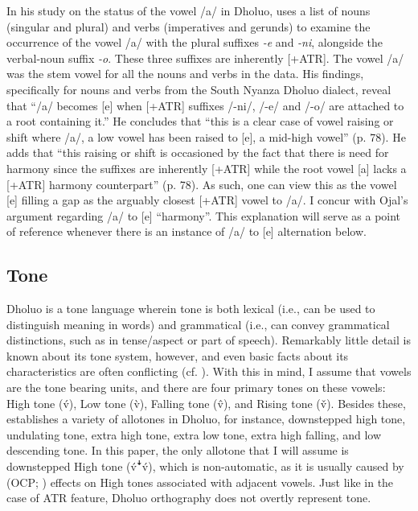 \documentclass[output=paper,colorlinks,citecolor=brown]{langscibook}
\begin{document}
In his study on the status of the vowel /a/ in Dholuo, \citet{Ojal2015} uses a list of nouns (singular and plural) and verbs (imperatives and gerunds) to examine the occurrence of the vowel /a/ with the plural suffixes \textit{-e} and \textit{-ni}, alongside the verbal-noun suffix \textit{-o}. These three suffixes are inherently [+ATR]. The vowel /a/ was the stem vowel for all the nouns and verbs in the data. His findings, specifically for nouns and verbs from the  South Nyanza Dholuo dialect, reveal that “/a/ becomes [e] when [+ATR] suffixes /-ni/, /-e/ and /-o/ are attached to a root containing it.” He concludes that “this is a clear case of vowel raising or shift where /a/, a low vowel has been raised to [e], a mid-high vowel” (p. 78). He adds that “this raising or shift is occasioned by the fact that there is need for harmony since the suffixes are inherently [+ATR] while the root vowel [a] lacks a [+ATR] harmony counterpart” (p. 78). As such, one can view this as the vowel [e] filling a gap as the arguably closest [+ATR] vowel to /a/. I concur with Ojal’s argument regarding /a/ to [e] ``harmony''. This explanation will serve as a point of reference whenever there is an instance of /a/ to [e] alternation below. 

\subsection{Tone}

Dholuo is a tone language wherein tone is both lexical (i.e., can be used to distinguish meaning in words) and grammatical (i.e., can convey grammatical distinctions, such as in tense/aspect or part of speech). Remarkably little detail is known about its tone system, however, and even basic facts about its characteristics are often conflicting (cf. \citealt{Gregersen1961, Okoth-Okombo1982, Okoth-Okombo1997, Ombijah2020, Tucker1994}). With this in mind, I assume that vowels are the tone bearing units, and there are four primary tones on these vowels: High tone (v́), Low tone (v̀), Falling tone (v̂), and Rising tone (v̌). Besides these, \citet{Tucker1994} establishes a variety of allotones in Dholuo, for instance, downstepped high tone, undulating tone, extra high tone, extra low tone, extra high falling, and low descending tone. In this paper, the only allotone that I will assume is downstepped High tone (v́ꜜv́), which is non-automatic, as it is usually caused by  (OCP; \citealt{Leben1973}) effects on High tones associated with adjacent vowels. Just like in the case of ATR feature, Dholuo orthography does not overtly represent tone.
\end{document}
